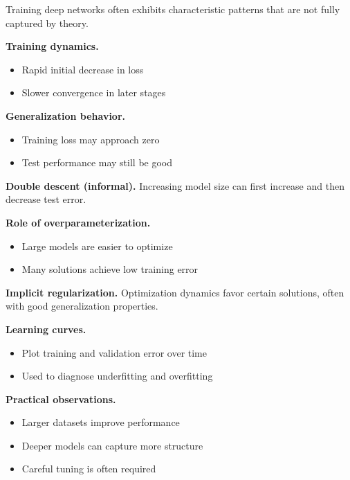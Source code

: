 Training deep networks often exhibits characteristic patterns that are not fully captured by theory.

\medskip

\noindent
\textbf{Training dynamics.}
\begin{itemize}
    \item Rapid initial decrease in loss
    \item Slower convergence in later stages
\end{itemize}

\medskip

\noindent
\textbf{Generalization behavior.}
\begin{itemize}
    \item Training loss may approach zero
    \item Test performance may still be good
\end{itemize}

\medskip

\noindent
\textbf{Double descent (informal).}  
Increasing model size can first increase and then decrease test error.

\medskip

\noindent
\textbf{Role of overparameterization.}
\begin{itemize}
    \item Large models are easier to optimize
    \item Many solutions achieve low training error
\end{itemize}

\medskip

\noindent
\textbf{Implicit regularization.}  
Optimization dynamics favor certain solutions, often with good generalization properties.

\medskip

\noindent
\textbf{Learning curves.}
\begin{itemize}
    \item Plot training and validation error over time
    \item Used to diagnose underfitting and overfitting
\end{itemize}

\medskip

\noindent
\textbf{Practical observations.}
\begin{itemize}
    \item Larger datasets improve performance
    \item Deeper models can capture more structure
    \item Careful tuning is often required
\end{itemize}


